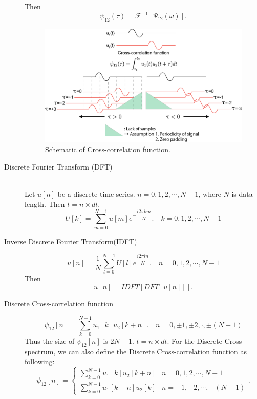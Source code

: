 \documentclass{proposal}
\begin{document}
\begin{description}
Then
\begin{equation}
\psi_{12}(\tau) = \mathcal{F}^{-1}[\Psi_{12}(\omega)].
\end{equation}


\begin{figure}
\center
\noindent\includegraphics[width=\textwidth]{crosscorrelation.png}
\caption{Schematic of Cross-correlation function.}
\label{fig:xcorr}
\end{figure}


\item[Discrete Fourier Transform (DFT)] ~ 
\\Let $u[n]$ be a discrete time series. $n=0,1,2, \cdots, N-1$, where $N$ is data length. Then $t = n\times dt$.  
\begin{equation}
U[k] = \sum_{m=0}^{N-1}u[m]e^{-\dfrac{i2\pi km}{N}}. \quad k = 0,1,2, \cdots, N-1
\end{equation}

\item[Inverse Discrete Fourier Transform(IDFT)]
\begin{equation}
u[n] = \dfrac{1}{N} \sum_{l=0}^{N-1} U[l] e^{\dfrac{i2\pi ln}{N}}. \quad n = 0,1,2, \cdots, N-1
\end{equation}
Then
\begin{equation}
u[n] = IDFT[DFT[u[n]]].
\end{equation}

\item[Discrete Cross-correlation function]
\begin{equation}
\psi_{12}[n] = \sum_{k=0}^{N-1}u_1[k]u_2[k+n]. \quad n = 0, \pm1, \pm2, \cdot, \pm(N-1)
\end{equation}
Thus the size of $\psi_{12}[n]$ is $2N-1$. $t = n\times dt$.
For the Discrete Cross spectrum, we can also define the Discrete Cross-correlation function as following:
\begin{equation}
\psi_{12}[n] = \begin{cases}
\sum_{k=0}^{N-1}u_1[k]u_2[k+n] & n = 0,1,2, \cdots, N-1\\
\sum_{k=0}^{N-1}u_1[k-n]u_2[k]  & n = -1,-2, \cdots, -(N-1)
\end{cases}.
\end{equation}


\end{description}
\end{document}
